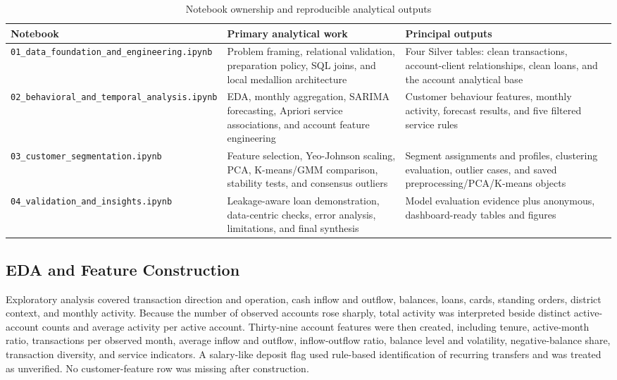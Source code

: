 \documentclass[conference]{IEEEtran}
\begin{document}
\begin{table}[t]
\caption{Notebook ownership and reproducible analytical outputs}
\label{tab:workflow}
\centering
\footnotesize
\begin{tabularx}{\textwidth}{p{} X X}
\toprule
\textbf{Notebook} & \textbf{Primary analytical work} & \textbf{Principal outputs} \\
\midrule
\nolinkurl{01_data_foundation_and_engineering.ipynb}
& Problem framing, relational validation, preparation policy, SQL joins, and local medallion architecture
& Four Silver tables: clean transactions, account-client relationships, clean loans, and the account analytical base \\
\nolinkurl{02_behavioral_and_temporal_analysis.ipynb}
& EDA, monthly aggregation, SARIMA forecasting, Apriori service associations, and account feature engineering
& Customer behaviour features, monthly activity, forecast results, and five filtered service rules \\
\nolinkurl{03_customer_segmentation.ipynb}
& Feature selection, Yeo-Johnson scaling, PCA, K-means/GMM comparison, stability tests, and consensus outliers
& Segment assignments and profiles, clustering evaluation, outlier cases, and saved preprocessing/PCA/K-means objects \\
\nolinkurl{04_validation_and_insights.ipynb}
& Leakage-aware loan demonstration, data-centric checks, error analysis, limitations, and final synthesis
& Model evaluation evidence plus anonymous, dashboard-ready tables and figures \\
\bottomrule
\end{tabularx}
\end{table}

\subsection{EDA and Feature Construction}

Exploratory analysis covered transaction direction and operation, cash inflow and outflow, balances, loans, cards, standing orders, district context, and monthly activity. Because the number of observed accounts rose sharply, total activity was interpreted beside distinct active-account counts and average activity per active account. Thirty-nine account features were then created, including tenure, active-month ratio, transactions per observed month, average inflow and outflow, inflow-outflow ratio, balance level and volatility, negative-balance share, transaction diversity, and service indicators. A salary-like deposit flag used rule-based identification of recurring transfers and was treated as unverified. No customer-feature row was missing after construction.
\end{document}
